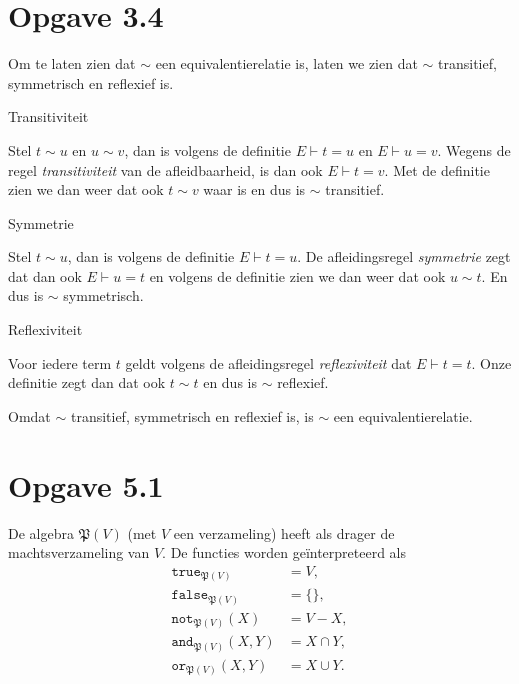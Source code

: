 \documentclass[a4paper,11pt]{article}
\begin{document}
\section*{Opgave 3.4}

Om te laten zien dat $\sim$ een equivalentierelatie is, laten we zien dat $\sim$
transitief, symmetrisch en reflexief is.

\begin{description}

\item{Transitiviteit}

  Stel $t \sim u$ en $u \sim v$, dan is volgens de definitie $E \vdash t = u$ en
  $E \vdash u = v$. Wegens de regel \emph{transitiviteit} van de
  afleidbaarheid, is dan ook $E \vdash t = v$. Met de definitie zien we dan
  weer dat ook $t \sim v$ waar is en dus is $\sim$ transitief.

\item{Symmetrie}

  Stel $t \sim u$, dan is volgens de definitie $E \vdash t = u$. De
  afleidingsregel \emph{symmetrie} zegt dat dan ook $E \vdash u = t$ en
  volgens de definitie zien we dan weer dat ook $u \sim t$. En dus is $\sim$
  symmetrisch.

\item{Reflexiviteit}

  Voor iedere term $t$ geldt volgens de afleidingsregel \emph{reflexiviteit}
  dat $E \vdash t = t$. Onze definitie zegt dan dat ook $t \sim t$ en dus is
  $\sim$ reflexief.

\end{description}

Omdat $\sim$ transitief, symmetrisch en reflexief is, is $\sim$ een
equivalentierelatie.


\section*{Opgave 5.1}

De algebra $\mathfrak{P}(V)$ (met $V$ een verzameling) heeft als drager de
machtsverzameling van $V$. De functies worden ge\"interpreteerd als
\begin{align*}
\texttt{true}_{\mathfrak{P}(V)}     &= V , \\
\texttt{false}_{\mathfrak{P}(V)}    &= \{\} , \\
\texttt{not}_{\mathfrak{P}(V)}(X)   &= V - X , \\
\texttt{and}_{\mathfrak{P}(V)}(X,Y) &= X \cap Y , \\
\texttt{or}_{\mathfrak{P}(V)}(X,Y)  &= X \cup Y .
\end{align*}
\end{document}
